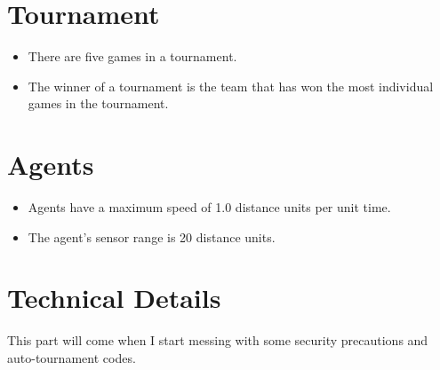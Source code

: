 \documentclass{article}
\begin{document}
\section*{Tournament}
	\begin{itemize}
		\item There are five games in a tournament. 
		\item The winner of a tournament is the team that has won the most individual games in the tournament. 
	\end{itemize}
\section*{Agents}
	\begin{itemize}
		\item Agents have a maximum speed of 1.0 distance units per unit time.
		\item The agent's sensor range is 20 distance units.
	\end{itemize}
\section*{Technical Details}
	This part will come when I start messing with some security precautions and auto-tournament codes. 
\end{document}
